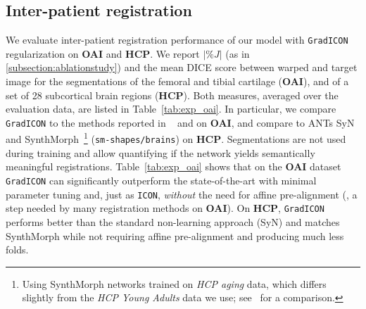 \subsection{Inter-patient registration}
\label{subsection:interpatientreg}
\vspace{-0.15cm}
We evaluate inter-patient registration performance of our model with \texttt{GradICON} regularization on \textbf{OAI} and \textbf{HCP}. We report $|\%J|$ (as in \ref{subsection:ablationstudy}) and the mean DICE score between warped and target image for the segmentations of the femoral and tibial cartilage (\textbf{OAI}), and of a set of 28 subcortical brain regions (\textbf{HCP}).
Both measures, averaged over the evaluation data, are listed in  Table~\ref{tab:exp_oai}. In particular, we compare \texttt{GradICON} to the methods reported in ~\cite{shen2019networks} and \cite{greer2021icon} on \textbf{OAI}, and compare to ANTs SyN~\cite{avants2008symmetric} and SynthMorph~\cite{hoffmann2022synthmorph}\footnote{Using SynthMorph networks trained on \emph{HCP aging} data, which differs slightly from the \emph{HCP Young Adults} data we use; see~\cite{harms2018972} for a comparison.} (\texttt{sm-shapes/brains}) on \textbf{HCP}. Segmentations are not used during training and allow quantifying if the network yields semantically meaningful registrations.
Table~\ref{tab:exp_oai} shows that on the \textbf{OAI} dataset \texttt{GradICON} can significantly outperform the state-of-the-art with minimal parameter tuning and, just as \texttt{ICON}, \emph{without} the need for affine pre-alignment (\ie, a step needed by many registration methods on \textbf{OAI}). On \textbf{HCP}, \texttt{GradICON} performs better than the standard
non-learning approach (SyN) and matches SynthMorph while not requiring affine pre-alignment and producing much less folds.
\addtolength{\tabcolsep}{-4.5pt}
\newcommand{\resTS}{\phantom{$\ddagger$}}
